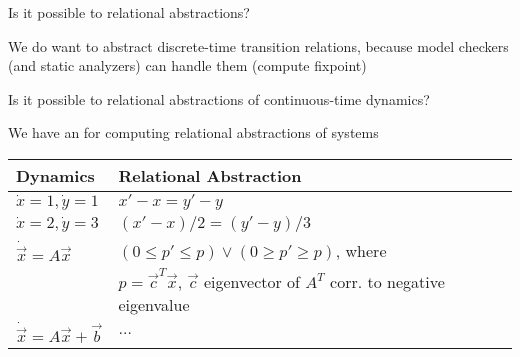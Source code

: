 \documentclass{seminar}
\newcommand\ignore[1]{{{}}}
\begin{document}
\begin{slide}

Is it possible to {} relational abstractions?

\bigskip

We do {} want to abstract discrete-time transition relations,
because model checkers (and static analyzers) can handle them (compute fixpoint)

\bigskip
Is it possible to {} relational abstractions of
continuous-time dynamics?

\ignore{
\small{
\begin{verbatim}
% Vending machine in SAL
vm: CONTEXT = 
BEGIN

 DollarAmount: TYPE = [0..5];
 QuarterAmount: TYPE = [0..20];
 CakeAmount: TYPE = [0..5];
 AppleAmount: TYPE = [0..10];

 machine: MODULE = 
 BEGIN
  OUTPUT 
   d: DollarAmount, q: QuarterAmount, c: CakeAmount, a: AppleAmount
  INITIALIZATION
   d IN {v: DollarAmount | v <= 4};
   q = 0;  c = 0; a = 0;
\end{verbatim}
}
\endignore}

\end{slide}
\begin{slide}

We have an {} for computing relational abstractions
of {} systems

\bigskip

\begin{tabular}{|l|l|}
\hline
Dynamics & Relational Abstraction
\\
\hline \hline
$\dot{x} = 1, \dot{y} = 1$
&
$x'-x = y'-y$
\\
\hline
$\dot{x} = 2, \dot{y} = 3$
&
$(x'-x)/2 = (y'-y)/3$
\\
\hline
$\dot{\vec{x}} = A\vec{x}$
&
$(0 \leq p' \leq p) \vee (0 \geq p' \geq p)$, where
\\
&
$p = \vec{c}^T\vec{x}$, $\vec{c}$ eigenvector
of $A^T$ corr. to negative eigenvalue
\\
\hline
$\dot{\vec{x}} = A\vec{x} + \vec{b}$
& 
$\ldots$
\\
\hline
\end{tabular}

\end{slide}
\end{document}
